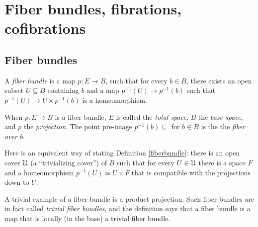 \section{Fiber bundles, fibrations, cofibrations}
\subsection{Fiber bundles}
\begin{definition}\label{fiberbundle}
    A {\em fiber bundle} is a map $p:E\to B$,
    such that for every $b\in B$, there exists
an open subset $U\subseteq B$ containing $b$ and
a map $p^{-1}(U)\to p^{-1}(b)$ such that $p^{-1}(U)\to U\times p^{-1}(b)$ is a homeomorphism.
\end{definition}    
When $p:E\to B$ is a fiber bundle, $E$ is called the \emph{total space}, 
$B$ the \emph{base space}, and $p$ the \emph{projection}.
The point pre-image $p^{-1}(b)\subseteq$ for $b\in B$ is the 
the \emph{fiber over $b$}.

Here is an equivalent way of stating Definition \ref{fiberbundle}:
there is an open cover $\mathcal U$ (a ``trivializing cover'') of $B$
such that for every $U\in\mathcal U$
there is a space $F$ and a homeomorphism
$p^{-1}(U)\simeq U\times F$ that is compatible with the projections 
down to $U$.

A trivial example of a fiber bundle is a product projection. Such fiber 
bundles are in fact called {\em trivial fiber bundles}, and the definition
says that a fiber bundle is a map that is locally (in the base) a trivial
fiber bundle. 

